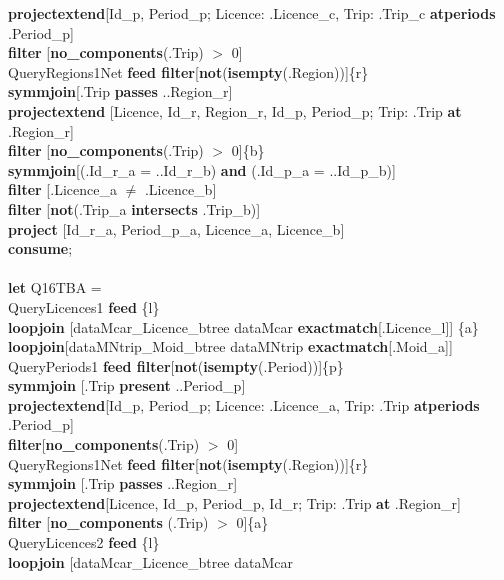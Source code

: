 \documentclass[a4paper]{article}
\newcommand{\op}[1]{\textbf{#1}}
\begin{document}
\begin{scriptsize}
\begin{tabbing}
\>\>\>\op{projectextend}[Id\_p, Period\_p; Licence: .Licence\_c, Trip: .Trip\_c
\op{atperiods} .Period\_p]\\
\>\>\>\op{filter} [\op{no\_components}(.Trip) $>$ 0]\\
\>\>QueryRegions1Net \op{feed filter}[\op{not}(\op{isempty}(.Region))]\{r\}\\
\>\>\op{symmjoin}[.Trip \op{passes} ..Region\_r]\\
\>\>\op{projectextend} [Licence, Id\_r, Region\_r, Id\_p, Period\_p; Trip: .Trip
\op{at} .Region\_r]\\
\>\>\op{filter} [\op{no\_components}(.Trip) $>$ 0]\{b\}\\
\>\op{symmjoin}[(.Id\_r\_a = ..Id\_r\_b) \op{and} (.Id\_p\_a = ..Id\_p\_b)]\\
\>\op{filter} [.Licence\_a $\neq$ .Licence\_b]\\
\>\op{filter} [\op{not}(.Trip\_a \op{intersects} .Trip\_b)]\\
\>\op{project} [Id\_r\_a, Period\_p\_a, Licence\_a, Licence\_b]\\
\op{consume};\\
\\
\op{let} Q16TBA =\\
\>QueryLicences1 \op{feed} \{l\}\\
\>\>\>\op{loopjoin} [dataMcar\_Licence\_btree dataMcar
\op{exactmatch}[.Licence\_l]] \{a\}\\
\>\>\>\op{loopjoin}[dataMNtrip\_Moid\_btree dataMNtrip
\op{exactmatch}[.Moid\_a]]\\
\>\>QueryPeriods1 \op{feed filter}[\op{not}(\op{isempty}(.Period))]\{p\}\\
\>\>\op{symmjoin} [.Trip \op{present} ..Period\_p]\\
\>\>\>\op{projectextend}[Id\_p, Period\_p; Licence: .Licence\_a, Trip: .Trip
\op{atperiods} .Period\_p]\\
\>\>\>\op{filter}[\op{no\_components}(.Trip) $>$ 0]\\
\>\>QueryRegions1Net \op{feed filter}[\op{not}(\op{isempty}(.Region))]\{r\}\\
\>\>\op{symmjoin} [.Trip \op{passes} ..Region\_r]\\
\>\>\>\op{projectextend}[Licence, Id\_p, Period\_p, Id\_r; Trip: .Trip \op{at}
.Region\_r]\\
\>\>\>\op{filter} [\op{no\_components} (.Trip) $>$ 0]\{a\}\\
\>QueryLicences2 \op{feed} \{l\}\\
\>\>\>\op{loopjoin} [dataMcar\_Licence\_btree dataMcar

\end{tabbing}
\end{scriptsize}
\end{document}
